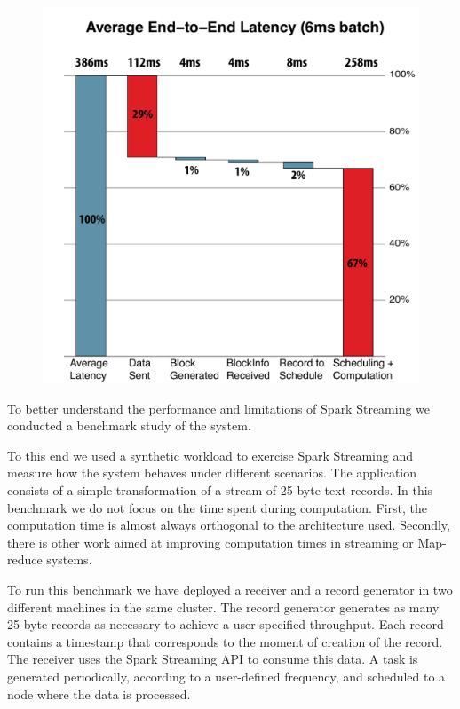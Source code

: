 \begin{figure}[t!]
  \begin{center}
    \includegraphics[scale=0.40]{images_graphs/waterfall/6ms_time_breakdown.pdf}
  \end{center}
  \caption{}
  \label{fig:SparkStreaming_time_breakdown}
\end{figure}

To better understand the performance and limitations of Spark Streaming we conducted a benchmark study of the system. 

To this end we used a synthetic workload to exercise Spark Streaming and measure how the system behaves under different scenarios. 
The application consists of a simple transformation of a stream of 25-byte text records.
In this benchmark we do not focus on the time spent during computation.
First, the computation time is almost always orthogonal to the architecture used.
Secondly, there is other work aimed at improving computation times in streaming or Map-reduce systems.

To run this benchmark we have deployed a receiver and a record generator in two different machines in the same cluster. 
The record generator generates as many 25-byte records as necessary to achieve a user-specified throughput. 
Each record contains a timestamp that corresponds to the moment of creation of the record. 
The receiver uses the Spark Streaming API to consume this data. 
A task is generated periodically, according to a user-defined frequency, and scheduled to a node where the data is processed.

